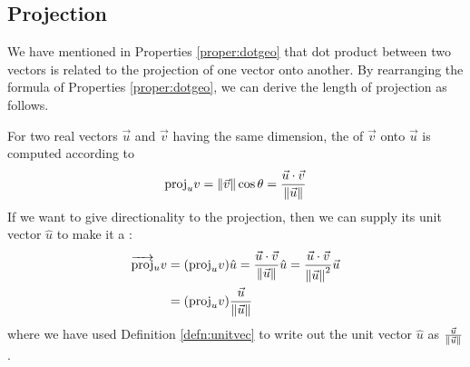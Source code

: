 \subsection{Projection}
We have mentioned in Properties \ref{proper:dotgeo} that dot product between two vectors is related to the projection of one vector onto another. By rearranging the formula of Properties \ref{proper:dotgeo}, we can derive the length of projection as follows.
\begin{center}
\end{center}
\begin{proper}
\label{proper:proj}
For two real vectors $\vec{u}$ and $\vec{v}$ having the same dimension, the  of $\vec{v}$ onto $\vec{u}$ is computed according to
\begin{align*}
\text{proj}_u v = \norm{\vec{v}} \cos\theta = \frac{\vec{u} \cdot \vec{v}}{\norm{\vec{u}}}    
\end{align*}
If we want to give directionality to the projection, then we can supply its unit vector $\hat{u}$ to make it a :
\begin{align*}
\overrightarrow{\text{proj}}_u v &= (\text{proj}_u v) \hat{u} = \frac{\vec{u} \cdot \vec{v}} {\norm{\vec{u}}} \hat{u} = \frac{\vec{u} \cdot \vec{v}}{\norm{\vec{u}}^2} \vec{u} \\
&= (\text{proj}_u v) \frac{\vec{u}}{\norm{\vec{u}}}
\end{align*}
where we have used Definition \ref{defn:unitvec} to write out the unit vector $\hat{u}$ as $\frac{\vec{u}}{\norm{\vec{u}}}$.
\end{proper}

